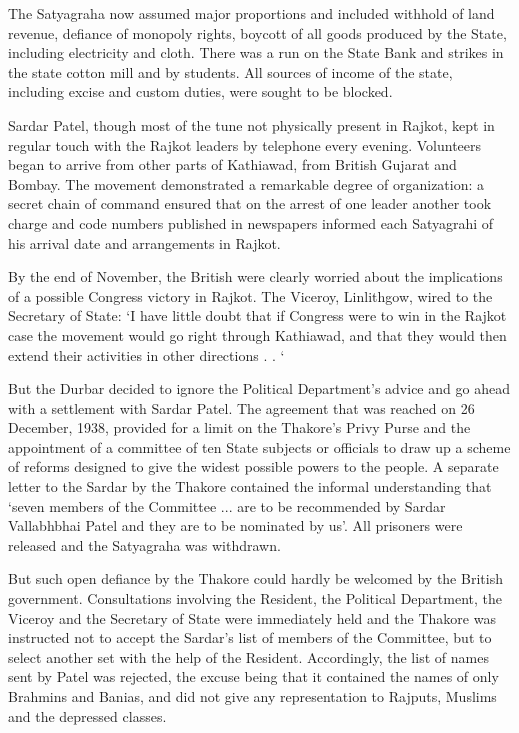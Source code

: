The Satyagraha now assumed major proportions and included withhold of land revenue, defiance of monopoly rights, boycott of all goods produced by the State, including electricity and cloth. There was a run on the State Bank and strikes in the state cotton mill and by students. All sources of income of the state, including excise and custom duties, were sought to be blocked. 

Sardar Patel, though most of the tune not physically present in Rajkot, kept in regular touch with the Rajkot leaders by telephone every evening. Volunteers began to arrive from other parts of Kathiawad, from British Gujarat and Bombay. The movement demonstrated a remarkable degree of organization: a secret chain of command ensured that on the arrest of one leader another took charge and code numbers published in newspapers informed each Satyagrahi of his arrival date and arrangements in Rajkot. 

By the end of November, the British were clearly worried about the implications of a possible Congress victory in Rajkot. The Viceroy, Linlithgow, wired to the Secretary of State: `I have little doubt that if Congress were to win in the Rajkot case the movement would go right through Kathiawad, and that they would then extend their activities in other directions . . ` 

But the Durbar decided to ignore the Political Department's advice and go ahead with a settlement with Sardar Patel. The agreement that was reached on 26 December, 1938, provided for a limit on the Thakore's Privy Purse and the appointment of a committee of ten State subjects or officials to draw up a scheme of reforms designed to give the widest possible powers to the people. A separate letter to the Sardar by the Thakore contained the informal understanding that `seven members of the Committee ... are to be recommended by Sardar Vallabhbhai Patel and they are to be nominated by us'. All prisoners were released and the Satyagraha was withdrawn. 

But such open defiance by the Thakore could hardly be welcomed by the British government. Consultations involving the Resident, the Political Department, the Viceroy and the Secretary of State were immediately held and the Thakore was instructed not to accept the Sardar's list of members of the Committee, but to select another set with the help of the Resident. Accordingly, the list of names sent by Patel was rejected, the excuse being that it contained the names of only Brahmins and Banias, and did not give any representation to Rajputs, Muslims and the depressed classes. 

